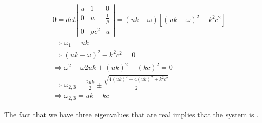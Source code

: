 \documentclass{article}
\begin{document}
\begin{enumerate}
\begin{enumerate}
\begin{eqnarray}
&& 0 = det \left|\begin{array}{ccc} u & 1 & 0 \\ 0 & u & \frac{1}{\rho}\\0 & \rho c^2 & u \end{array} \right| = (uk - \omega)\left[(uk-\omega)^2-k^2c^2 \right]\nonumber \\
&& \Rightarrow \boxed{\omega_1 = uk}\nonumber \\
&& \Rightarrow (uk-\omega)^2-k^2c^2 = 0 \nonumber \\
&& \Rightarrow \omega^2 - \omega 2uk+(uk)^2-(kc)^2 = 0\nonumber \\
&& \Rightarrow \omega_{2,3} = \frac{2uk}{2} \pm \frac{\sqrt{4(uk)^2-4(uk)^2+k^2c^2}}{2}\nonumber \\
&& \Rightarrow \boxed{ \omega_{2,3} = uk \pm kc}
\end{eqnarray}

The fact that we have three eigenvalues that are real implies that the system is .

\end{enumerate}

\end{enumerate}
\end{document}
